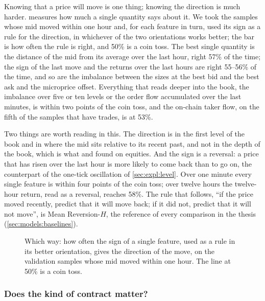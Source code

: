 Knowing that a price will move is one thing; knowing the direction is much harder.
 measures how much a single quantity says about it.  We took the
samples whose mid moved within one hour and, for each feature in turn, used its sign as a
rule for the direction, in whichever of the two orientations works better; the bar is how
often the rule is right, and 50\% is a coin toss.  The best single quantity is the
distance of the mid from its average over the last hour, right 57\% of the time; the sign
of the last move and the returns over the last hours are right 55--56\% of the time, and
so are the imbalance between the sizes at the best bid and the best ask and the microprice
offset.  Everything that reads deeper into the book, the imbalance over five or ten levels
or the order flow accumulated over the last minutes, is within two points of the coin
toss, and the on-chain taker flow, on the fifth of the samples that have trades, is at
53\%.

Two things are worth reading in this.  The direction is in the first level of the book
and in where the mid sits relative to its recent past, and not in the depth of the book,
which is what \textcite{tran2022beyondbest} and \textcite{kolm2023dofi} found on equities.
And the sign is a reversal: a price that has risen over the last hour is more likely to
come back than to go on, the counterpart of the one-tick oscillation of
\cref{sec:expl:level}.  Over one minute every single feature is within four points of the
coin toss; over twelve hours the twelve-hour return, read as a reversal, reaches 58\%.  The
rule that follows, ``if the price moved recently, predict that it will move back; if it did
not, predict that it will not move'', is Mean Reversion-$H$, the reference of every
comparison in the thesis (\cref{sec:models:baselines}).

\begin{figure}[t]
\centering

\caption{Which way: how often the sign of a single feature, used as a rule in its better
orientation, gives the direction of the move, on the validation samples whose mid moved
within one hour.  The line at 50\% is a coin toss.}
\label{fig:expl:direction}
\end{figure}

\subsubsection{Does the kind of contract matter?}
\label{sec:expl:templates}

